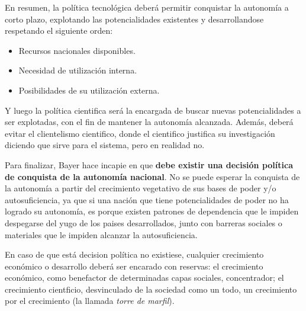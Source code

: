 En resumen, la política tecnológica deberá permitir conquistar la autonomía a corto
plazo, explotando las potencialidades existentes y desarrollandose respetando el siguiente orden:
\begin{itemize}
    \item Recursos nacionales disponibles.
    \item Necesidad de utilización interna.
    \item Posibilidades de su utilización externa.
\end{itemize}

Y luego la política cientifica será la encargada de buscar nuevas potencialidades a ser explotadas, con el fin de mantener la autonomía alcanzada. Además, deberá evitar el clientelismo cientifico, donde el cientifico justifica su investigación diciendo que sirve para el sistema, pero en realidad no.

\vspace{0.5em}

Para finalizar, Bayer hace incapie en que \textbf{debe existir una decisión política de conquista de la autonomía nacional}. No se puede esperar la conquista de la autonomía a partir del crecimiento vegetativo de sus bases de poder y/o autosuficiencia, ya que si una nación que tiene potencialidades de poder no ha logrado su autonomía, es porque existen patrones de dependencia que le impiden despegarse del yugo de los paises desarrollados, junto con barreras sociales o materiales que le impiden alcanzar la autosuficiencia.

En caso de que está decision política no existiese, cualquier crecimiento económico o desarrollo deberá ser encarado con reservas: el crecimiento económico, como benefactor de determinadas capas sociales, concentrador; el crecimiento cientficio, desvinculado de la sociedad como un todo, un crecimiento por el crecimiento (la llamada \textit{torre de marfil}).
